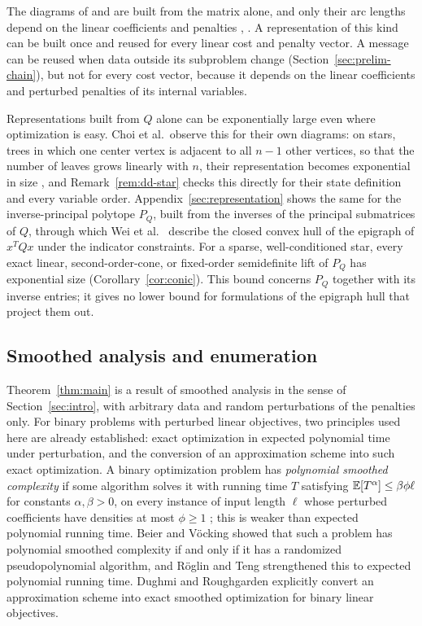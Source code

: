 The diagrams of \cite{GomezBanded} and \cite{ChoiDiagrams} are built
from the matrix alone, and only their arc lengths depend on the linear
coefficients and penalties \cite[Remark~1]{GomezBanded},
\cite[Definition~7 and Proposition~6]{ChoiDiagrams}. A representation of
this kind can be built once and reused for every linear cost and penalty
vector. A message can be reused when data outside its subproblem change
(Section~\ref{sec:prelim-chain}), but not for every cost vector, because
it depends on the linear coefficients and perturbed penalties of its
internal variables.

Representations built from $Q$ alone can be exponentially large even
where optimization is easy. Choi et al.\ observe this for their own
diagrams: on stars, trees in which one center vertex is adjacent to all
$n-1$ other vertices, so that the number of leaves grows linearly with
$n$, their representation becomes exponential in size
\cite[Section~7.2]{ChoiDiagrams}, and Remark~\ref{rem:dd-star} checks
this directly for their state definition and every variable order.
Appendix~\ref{sec:representation} shows the same for the
inverse-principal polytope $P_Q$, built from the inverses of the
principal submatrices of $Q$, through which Wei et al.\
\cite[Section~3.1 and Theorem~1]{WeiHull} describe the closed convex
hull of the epigraph of $x^TQx$ under the indicator constraints. For a
sparse, well-conditioned star, every exact linear, second-order-cone, or
fixed-order semidefinite lift of $P_Q$ has exponential size
(Corollary~\ref{cor:conic}). This bound concerns $P_Q$ together with its
inverse entries; it gives no lower bound for formulations of the
epigraph hull that project them out.

\subsection{Smoothed analysis and enumeration}
Theorem~\ref{thm:main} is a result of smoothed analysis in the sense of
Section~\ref{sec:intro}, with arbitrary data and random perturbations of
the penalties only. For binary problems with perturbed linear
objectives, two principles used here are already established: exact
optimization in expected polynomial time under perturbation, and the
conversion of an approximation scheme into such exact optimization. A
binary optimization problem has \emph{polynomial smoothed complexity} if
some algorithm solves it with running time $T$ satisfying
$\mathbb E[T^\alpha]\le\beta\phi\ell$ for constants $\alpha,\beta>0$, on every
instance of input length $\ell$ whose perturbed coefficients have
densities at most $\phi\ge1$ \cite[conference version,
Section~1.3]{BeierVocking}; this is weaker than expected polynomial
running time. Beier and V\"ocking \cite[conference version,
Theorem~3]{BeierVocking} showed that such a problem has polynomial
smoothed complexity if and only if it has a randomized pseudopolynomial
algorithm, and R\"oglin and Teng \cite[Section~6.2]{RoglinTeng}
strengthened this to expected polynomial running time. Dughmi and
Roughgarden \cite[Proposition~2.4]{DughmiRoughgarden} explicitly convert
an approximation scheme into exact smoothed optimization for binary
linear objectives.

